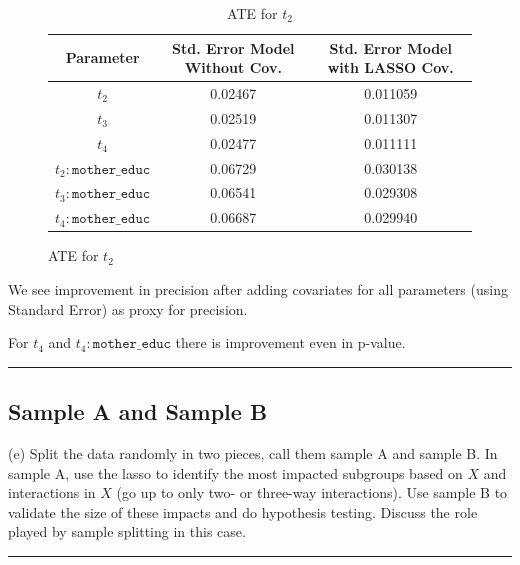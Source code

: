\documentclass{article}
\newenvironment{colorparagraph}[1]{\par\color{#1}}{\par}
\begin{document}
\begin{figure}[H]
  \begin{table}[H]
  \centering
  \begin{tabular}{|c|cc|}
    \hline
    Parameter & Std. Error Model Without Cov. & Std. Error Model with LASSO Cov. \\
    \hline
    $t_2$                       & 0.02467       & 0.011059 \\
    $t_3$                       & 0.02519       & 0.011307 \\
    $t_4$                       & 0.02477       & 0.011111 \\
    $t_2:\texttt{mother\_educ}$ & 0.06729       & 0.030138 \\
    $t_3:\texttt{mother\_educ}$ & 0.06541       & 0.029308 \\
    $t_4:\texttt{mother\_educ}$ & 0.06687       & 0.029940 \\
    \hline
  \end{tabular}
  \caption{ATE for $t_2$}
\end{table}
\end{figure}

We see improvement in precision after adding covariates for all parameters (using Standard Error) as proxy for precision.

For $t_4$ and $t_4:\texttt{mother\_educ}$ there is improvement even in p-value.


\begin{colorparagraph}{questioncolor}
\rule{\textwidth}{0.5pt}
\subsection{Sample A and Sample B}
\label{q3e}
(e) Split the data randomly in two pieces, call them sample A and sample B. In sample A, use the lasso to identify the most impacted subgroups based on \( X \) and interactions in \( X \) (go up to only two- or three-way interactions). Use sample B to validate the size of these impacts and do hypothesis testing. Discuss the role played by sample splitting in this case.

\rule{\textwidth}{0.5pt}
\end{colorparagraph}
\end{document}
